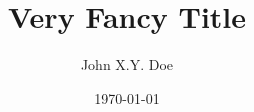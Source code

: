 \documentclass[
    apa, %
    master, %
    english, %
    singlepage %
]{mba}
\title{Very Fancy Title}
\author{John X.Y. Doe}
\date{\today}
\begin{document}
\frontmatter
\maketitle
\makeacknowledgements
\makeabstract
\maketableofcontents
\makeacronyms
\listoffigures
\listoftables
\mainmatter






\backmatter
\appendix

\makebibliography

\end{document}
